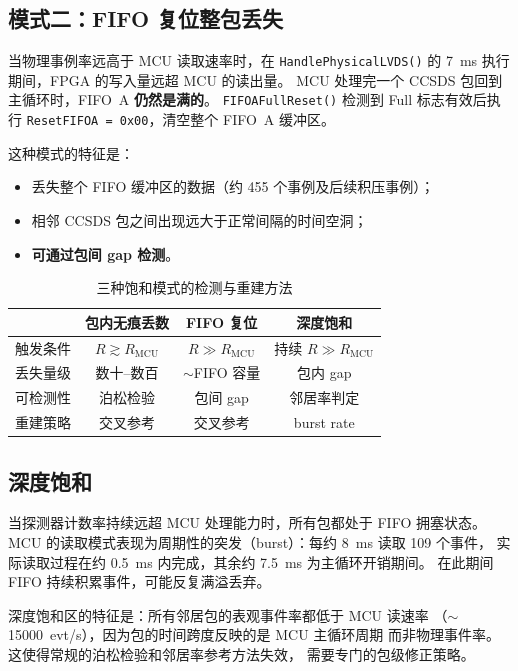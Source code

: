 \documentclass[aps,prd,twocolumn,nofootinbib,superscriptaddress]{revtex4-2}
\begin{document}
\subsection{模式二：FIFO 复位整包丢失}

当物理事例率远高于 MCU 读取速率时，在 \texttt{HandlePhysicalLVDS()} 的 7~ms
执行期间，FPGA 的写入量远超 MCU 的读出量。
MCU 处理完一个 CCSDS 包回到主循环时，FIFO~A \textbf{仍然是满的}。
\texttt{FIFOAFullReset()} 检测到 Full 标志有效后执行
\texttt{ResetFIFOA = 0x00}，清空整个 FIFO~A 缓冲区。

这种模式的特征是：
\begin{itemize}
  \item 丢失整个 FIFO 缓冲区的数据（约 455 个事例及后续积压事例）；
  \item 相邻 CCSDS 包之间出现远大于正常间隔的时间空洞；
  \item \textbf{可通过包间 gap 检测}。
\end{itemize}

\begin{table}[t]
\centering
\caption{三种饱和模式的检测与重建方法}
\label{tab:modes}
\begin{tabular}{lccc}
\toprule
 & 包内无痕丢数 & FIFO 复位 & 深度饱和 \\
\midrule
触发条件 & $R \gtrsim R_\mathrm{MCU}$ & $R \gg R_\mathrm{MCU}$ & 持续 $R \gg R_\mathrm{MCU}$ \\
丢失量级 & 数十--数百 & $\sim$FIFO 容量 & 包内 gap \\
可检测性 & 泊松检验 & 包间 gap & 邻居率判定 \\
重建策略 & 交叉参考 & 交叉参考 & burst rate \\
\bottomrule
\end{tabular}
\end{table}

\subsection{深度饱和}

当探测器计数率持续远超 MCU 处理能力时，所有包都处于 FIFO 拥塞状态。
MCU 的读取模式表现为周期性的突发（burst）：每约 8~ms 读取 109 个事件，
实际读取过程在约 0.5~ms 内完成，其余约 7.5~ms 为主循环开销期间。
在此期间 FIFO 持续积累事件，可能反复满溢丢弃。

深度饱和区的特征是：所有邻居包的表观事件率都低于 MCU 读速率
（$\sim$15000~evt/s），因为包的时间跨度反映的是 MCU 主循环周期
而非物理事件率。这使得常规的泊松检验和邻居率参考方法失效，
需要专门的包级修正策略。
\end{document}

